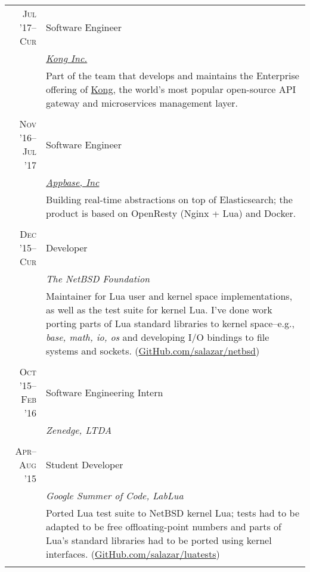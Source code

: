 \documentclass[a4paper,10pt]{article}
\begin{document}
\begin{longtable}{r|p{11cm}}

  \textsc{Jul '17--Cur} & Software Engineer\\
  &\emph{\href{https://konghq.com}{Kong Inc.}}\\
  &\footnotesize{Part of the team that develops and maintains the Enterprise
  offering of \href{https://konghq.com/}{Kong}, the world's most popular
  open-source API gateway and microservices management layer.}
  \\\multicolumn{2}{c}{} \\

  \textsc{Nov '16--Jul '17} & Software Engineer\\
  &\emph{\href{https://appbase.io}{Appbase, Inc}}\\
  &\footnotesize{Building real-time abstractions on top of
  Elasticsearch; the product is based on OpenResty (Nginx + Lua) and Docker.}
  \\\multicolumn{2}{c}{} \\

  \textsc{Dec '15--Cur} & Developer\\ &\emph{The NetBSD
  Foundation}\\ &\footnotesize{Maintainer for Lua user and kernel
  space implementations, as well as the test suite for kernel Lua.
  I've done work porting parts of Lua standard
  libraries to kernel space--e.g., \emph{base, math, io, os} and
  developing I/O bindings to file systems and sockets.
  (\href{https://GitHub.com/salazar/netbsd}{GitHub.com/salazar/netbsd}})
  \\\multicolumn{2}{c}{} \\

  \textsc{Oct '15--Feb '16} & Software Engineering Intern \\ &\emph{Zenedge,
  LTDA}\\ \multicolumn{2}{c}{} \\

  \textsc{Apr--Aug '15} & Student Developer \\ &\emph{Google Summer of
  Code, LabLua}\\ &\footnotesize{Ported Lua test suite to NetBSD
  kernel Lua; tests
  had to be adapted to be free offloating-point numbers and parts of Lua's standard libraries had to be
  ported using kernel interfaces.
  (\href{https://GitHub.com/salazar/luatests}{GitHub.com/salazar/luatests}})
  \\\multicolumn{2}{c}{} \\


\end{longtable}
\end{document}
